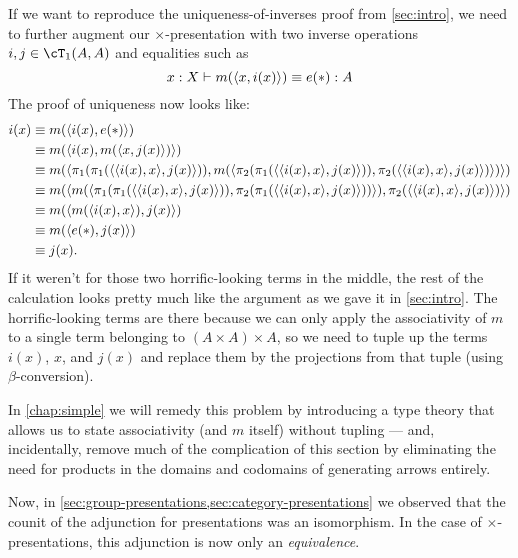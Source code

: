 If we want to reproduce the uniqueness-of-inverses proof from \cref{sec:intro}, we need to further augment our $\times$-presentation with two inverse operations $i,j \in \cT_1(A,A)$ and equalities such as
\[ x:X \vdash m(\langle x,i(x)\rangle) \equiv e(\mathord{\ast}) : A \]
The proof of uniqueness now looks like:
\begin{align*}
  i(x)
  &\equiv m(\langle i(x),e(\mathord{\ast})\rangle)\\
  &\equiv m(\langle i(x),m(\langle x,j(x)\rangle)\rangle)\\
  &\equiv m(\langle \pi_1(\pi_1(\langle \langle i(x),x\rangle,j(x)\rangle)),m(\langle \pi_2(\pi_1(\langle \langle i(x),x\rangle,j(x)\rangle)),\pi_2(\langle \langle i(x),x\rangle,j(x)\rangle)\rangle)\rangle)\\
  &\equiv m(\langle m(\langle \pi_1(\pi_1(\langle \langle i(x),x\rangle,j(x)\rangle)),\pi_2(\pi_1(\langle \langle i(x),x\rangle,j(x)\rangle))\rangle),\pi_2(\langle \langle i(x),x\rangle,j(x)\rangle)\rangle)\\
  &\equiv m(\langle m(\langle i(x),x\rangle),j(x)\rangle)\\
  &\equiv m(\langle e(\mathord{\ast}),j(x)\rangle)\\
  &\equiv j(x).
\end{align*}
If it weren't for those two horrific-looking terms in the middle, the rest of the calculation looks pretty much like the argument as we gave it in \cref{sec:intro}.
The horrific-looking terms are there because we can only apply the associativity of $m$ to a single term belonging to $(A\times A)\times A$, so we need to tuple up the terms $i(x)$, $x$, and $j(x)$ and replace them by the projections from that tuple (using $\beta$-conversion).

In \cref{chap:simple} we will remedy this problem by introducing a type theory that allows us to state associativity (and $m$ itself) without tupling --- and, incidentally, remove much of the complication of this section by eliminating the need for products in the domains and codomains of generating arrows entirely.

Now, in \cref{sec:group-presentations,sec:category-presentations} we observed that the counit of the adjunction for presentations was an isomorphism.
In the case of $\times$-presentations, this adjunction is now only an \emph{equivalence}.

